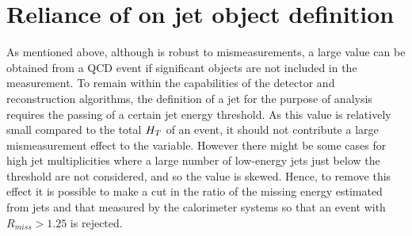 \section{Reliance of \alt on jet object definition}

As mentioned above, although \alt is robust to mismeasurements, a large value can be obtained from a QCD event if significant objects are not included in the measurement. To remain within the capabilities of the detector and reconstruction algorithms, the definition of a jet for the purpose of analysis requires the passing of a certain jet energy threshold. As this value is relatively small compared to the total $H_{T}$ of an event, it should not contribute a large mismeasurement effect to the \alt variable. However there might be some cases for high jet multiplicities where a large number of low-energy jets just below the threshold are not considered, and so the \alt value is skewed. Hence, to remove this effect it is possible to make a cut in the ratio of the missing energy estimated from jets \mht and that measured by the calorimeter systems \met so that an event with $R_{miss} > 1.25$ is rejected. 
